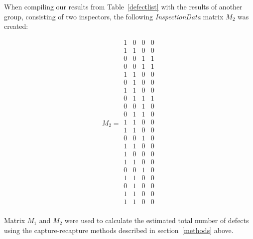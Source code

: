 \noindent When compiling our results from Table~\ref{defectlist} with the results of another group, consisting of two inspectors, the following \textit{InspectionData} matrix $M_{2}$ was created:

\[
M_{2} =
\begin{array}{cccc}
 1 & 0 & 0 & 0 \\
 1 & 1 & 0 & 0 \\
 0 & 0 & 1 & 1 \\
 0 & 0 & 1 & 1 \\
 1 & 1 & 0 & 0 \\
 0 & 1 & 0 & 0 \\
 1 & 1 & 0 & 0 \\
 0 & 1 & 1 & 1 \\
 0 & 0 & 1 & 0 \\
 0 & 1 & 1 & 0 \\
 1 & 1 & 0 & 0 \\
 1 & 1 & 0 & 0 \\
 0 & 0 & 1 & 0 \\
 1 & 1 & 0 & 0 \\
 1 & 0 & 0 & 0 \\
 1 & 1 & 0 & 0 \\
 0 & 0 & 1 & 0 \\
 1 & 1 & 0 & 0 \\
 0 & 1 & 0 & 0 \\
 1 & 1 & 0 & 0 \\
 1 & 1 & 0 & 0 \\
\end{array}
\]

\noindent Matrix $M_{1}$ and $M_{2}$ were used to calculate the estimated total number of defects using the capture-recapture methods described in section~\ref{methods} above. 